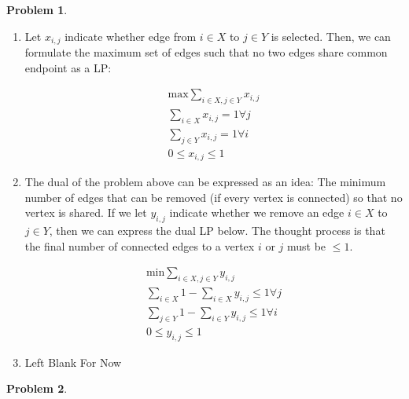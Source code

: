 \documentclass[11pt]{article}
\theoremstyle{definition}
\theoremstyle{case}
\theoremstyle{theorem}
\newtheorem{prob}{Problem}
\begin{document}
\begin{prob}
\end{prob}

\begin{enumerate}[label=(\alph*)]

\item Let $x_{i,j}$ indicate whether edge from $i \in X$ to $j \in Y$ is selected. Then,
we can formulate the maximum set of edges such that no two edges share common endpoint as a LP:

\begin{align*}
  \text{max} \sum_{i \in X, j \in Y} x_{i,j} \\
  \sum_{i \in X} x_{i,j} = 1 \forall j \\
  \sum_{j \in Y} x_{i,j} = 1 \forall i \\
  0 \leq x_{i,j} \leq 1 
\end{align*}

\item The dual of the problem above can be expressed as an idea: The minimum number of edges
that can be removed (if every vertex is connected) so that no vertex is shared. If we let
$y_{i,j}$ indicate whether we remove an edge $i \in X$ to $j \in Y$, then we can express the dual LP below.
The thought process is that the final number of connected edges to a vertex $i$ or $j$ must be $\leq 1$.

\begin{align*}
  \text{min} \sum_{i \in X, j \in Y} y_{i,j} \\
  \sum_{i \in X} 1 - \sum_{i \in X} y_{i,j} \leq 1 \forall j \\
  \sum_{j \in Y} 1 - \sum_{i \in Y} y_{i,j} \leq 1 \forall i \\
  0 \leq y_{i,j} \leq 1
\end{align*}

\item Left Blank For Now

\end{enumerate}

\begin{prob}
\end{prob}
\end{document}

